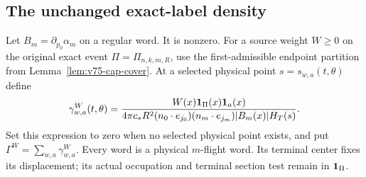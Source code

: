 \subsection{The unchanged exact-label density}
Let $B_m=\partial_{p_0}\alpha_m$ on a regular word. It is nonzero.
For a source weight $W\ge0$ on the original exact event
$\Pi=\Pi_{n,k,m,R}$, use the first-admissible endpoint partition
from Lemma~\ref{lem:v75-cap-cover}. At a selected physical point
$s=s_{w,a}(t,\theta)$ define
\begin{equation}\label{eq:v75-gauss-density}
 \gamma^W_{w,a}(t,\theta)=
 \frac{W(x)\one_\Pi(x)\one_a(x)}
 {4\pi c_* R^2(n_0\cdot e_{j_0})(n_m\cdot e_{j_m})
                         |B_m(x)|H_T(s)}.
\end{equation}
Set this expression to zero when no selected physical point exists,
and put $\Gamma^W=\sum_{w,a}\gamma^W_{w,a}$. Every word is a
physical $m$-flight word. Its terminal center fixes its displacement;
its actual occupation and terminal section test remain in $\mathbf1_\Pi$.

